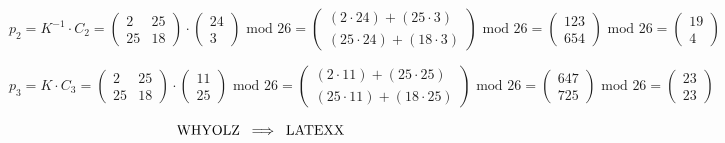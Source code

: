 \[
p_2 = K^{-1} \cdot C_2 = \begin{pmatrix} 2 & 25 \\ 25 & 18 \end{pmatrix} \cdot \begin{pmatrix} 24 \\ 3
\end{pmatrix} \text{ mod } 26 = \begin{pmatrix} (2 \cdot 24) + (25 \cdot 3) \\ (25 \cdot 24) +
(18 \cdot 3) \end{pmatrix} \text{ mod } 26 = \begin{pmatrix} 123 \\ 654 \end{pmatrix}
\text{ mod } 26 = \boxed{\begin{pmatrix} 19 \\ 4 \end{pmatrix}}
\]

\[
p_3 = K \cdot C_3 = \begin{pmatrix} 2 & 25 \\ 25 & 18 \end{pmatrix} \cdot \begin{pmatrix} 11 \\ 25
\end{pmatrix} \text{ mod } 26 = \begin{pmatrix} (2 \cdot 11) + (25 \cdot 25) \\ (25 \cdot 11) +
(18 \cdot 25) \end{pmatrix} \text{ mod } 26 = \begin{pmatrix} 647 \\ 725 \end{pmatrix}
\text{ mod } 26 = \boxed{\begin{pmatrix}23 \\ 23 \end{pmatrix}}
\]


\[\text{WHYOLZ} \hspace{0.2cm} \Longrightarrow \hspace{0.2cm} \text{LATEXX}\]


\vspace{1cm}


